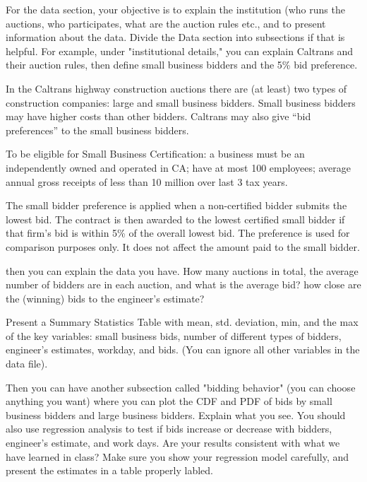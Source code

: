 For the data section, your objective is to explain the institution (who runs
the auctions, who participates, what are the auction rules etc., and to
present information about the data. Divide the Data section into subsections
if that is helpful. For example, under "institutional details," you can
explain Caltrans and their auction rules, then define small business bidders
and the 5\% bid preference.

In the Caltrans highway construction auctions there are (at least) two
types of construction companies: large and small business bidders.
Small business bidders may have higher costs than other bidders.
Caltrans may also give “bid preferences” to the small business bidders.

To be eligible for Small Business Certification:
a business must be an independently owned and operated in CA;
have at most 100 employees; average annual gross receipts of less than
10 million over last 3 tax years.

The small bidder preference is applied when a non-certified bidder
submits the lowest bid.
The contract is then awarded to the lowest certified small bidder if
that firm’s bid is within 5\% of the overall lowest bid.
The preference is used for comparison purposes only. It does not
affect the amount paid to the small bidder.

then you can explain the data you have.
How many auctions in total, the average number of bidders are in each auction,
and what is the average bid?
how close are the (winning) bids to the engineer's estimate?

Present a Summary Statistics Table with mean, std. deviation, min, and the max
of the key variables: small business bids, number of different types of
bidders, engineer's estimates, workday, and bids.
(You can ignore all other variables in the data file).

 

Then you can have another subsection called "bidding behavior" (you can choose anything you want) where you can plot the CDF and PDF of bids by small business bidders and large business bidders. Explain what you see. You should also use regression analysis to test if bids increase or decrease with bidders, engineer's estimate, and work days. Are your results consistent with what we have learned in class? Make sure you show your regression model carefully, and present the estimates in a table properly labled.
